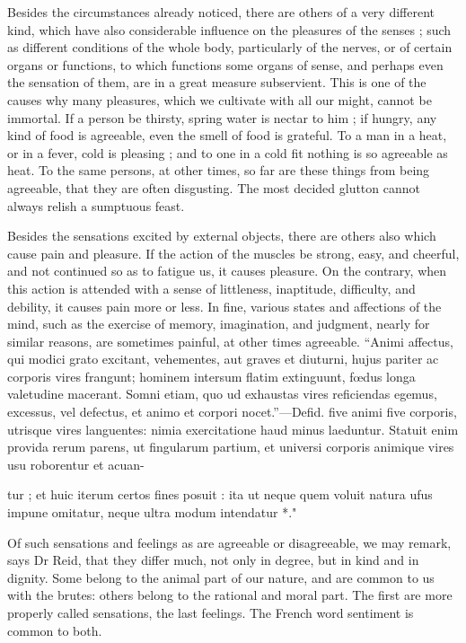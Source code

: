 \documentclass{article}
\begin{document}
Besides the circumstances already noticed, there are others of a very different kind, which have also considerable influence on the pleasures of the senses ; such as different conditions of the whole body, particularly of the nerves, or of certain organs or functions, to which functions some organs of sense, and perhaps even the sensation of them, are in a great measure subservient. This is one of the causes why many pleasures, which we cultivate with all our might, cannot be immortal. If a person be thirsty, spring water is nectar to him ; if hungry, any kind of food is agreeable, even the smell of food is grateful. To a man in a heat, or in a fever, cold is pleasing ; and to one in a cold fit nothing is so agreeable as heat. To the same persons, at other times, so far are these things from being agreeable, that they are often disgusting. The most decided glutton cannot always relish a sumptuous feast.

Besides the sensations excited by external objects, there are others also which cause pain and pleasure. If the action of the muscles be strong, easy, and cheerful, and not continued so as to fatigue us, it causes pleasure. On the contrary, when this action is attended with a sense of littleness, inaptitude, difficulty, and debility, it causes pain more or less. In fine, various states and affections of the mind, such as the exercise of memory, imagination, and judgment, nearly for similar reasons, are sometimes painful, at other times agreeable. “Animi affectus, qui modici grato excitant, vehementes, aut graves et diuturni, hujus pariter ac corporis vires frangunt; hominem intersum flatim extinguunt, fœdus longa valetudine macerant. Somni etiam, quo ud exhaustas vires reficiendas egemus, excessus, vel defectus, et animo et corpori nocet.”—Defid. five animi five corporis, utrisque vires languentes: nimia exercitatione haud minus laeduntur. Statuit enim provida rerum parens, ut fingularum partium, et universi corporis animique vires usu roborentur et acuan-

tur ; et huic iterum certos fines posuit : ita ut neque
quem voluit natura ufus impune omitatur, neque ultra
modum intendatur *."

Of such sensations and feelings as are agreeable or disagreeable, we may remark, says Dr Reid, that they differ much, not only in degree, but in kind and in dignity. Some belong to the animal part of our nature, and are common to us with the brutes: others belong to the rational and moral part. The first are more properly called sensations, the last feelings. The French word sentiment is common to both.
\end{document}
